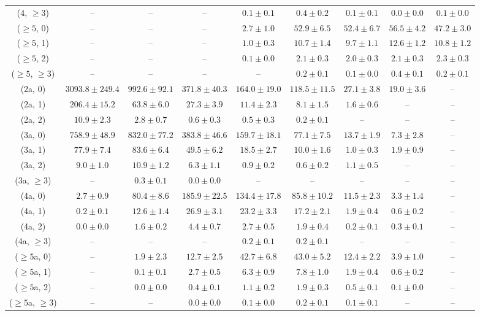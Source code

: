 \begin{table}[h!]
{\begin{tabular}{ccccccccc}
	(4, $\ge3$) & -- & -- & -- & $0.1\pm 0.1$ & $0.4\pm 0.2$ & $0.1\pm 0.1$ & $0.0\pm 0.0$ & $0.1\pm 0.0$ \\[0.5ex] 
	($\ge5$, 0) & -- & -- & -- & $2.7\pm 1.0$ & $52.9\pm 6.5$ & $52.4\pm 6.7$ & $56.5\pm 4.2$ & $47.2\pm 3.0$ \\[0.5ex] 
	($\ge5$, 1) & -- & -- & -- & $1.0\pm 0.3$ & $10.7\pm 1.4$ & $9.7\pm 1.1$ & $12.6\pm 1.2$ & $10.8\pm 1.2$ \\[0.5ex] 
	($\ge5$, 2) & -- & -- & -- & $0.1\pm 0.0$ & $2.1\pm 0.3$ & $2.0\pm 0.3$ & $2.1\pm 0.3$ & $2.3\pm 0.3$ \\[0.5ex] 
	($\ge5$, $\ge3$) & -- & -- & -- & -- & $0.2\pm 0.1$ & $0.1\pm 0.0$ & $0.4\pm 0.1$ & $0.2\pm 0.1$ \\[0.5ex] 
	(2a, 0) & $3093.8\pm 249.4$ & $992.6\pm 92.1$ & $371.8\pm 40.3$ & $164.0\pm 19.0$ & $118.5\pm 11.5$ & $27.1\pm 3.8$ & $19.0\pm 3.6$ & -- \\[0.5ex] 
	(2a, 1) & $206.4\pm 15.2$ & $63.8\pm 6.0$ & $27.3\pm 3.9$ & $11.4\pm 2.3$ & $8.1\pm 1.5$ & $1.6\pm 0.6$ & -- & -- \\[0.5ex] 
	(2a, 2) & $10.9\pm 2.3$ & $2.8\pm 0.7$ & $0.6\pm 0.3$ & $0.5\pm 0.3$ & $0.2\pm 0.1$ & -- & -- & -- \\[0.5ex] 
	(3a, 0) & $758.9\pm 48.9$ & $832.0\pm 77.2$ & $383.8\pm 46.6$ & $159.7\pm 18.1$ & $77.1\pm 7.5$ & $13.7\pm 1.9$ & $7.3\pm 2.8$ & -- \\[0.5ex] 
	(3a, 1) & $77.9\pm 7.4$ & $83.6\pm 6.4$ & $49.5\pm 6.2$ & $18.5\pm 2.7$ & $10.0\pm 1.6$ & $1.0\pm 0.3$ & $1.9\pm 0.9$ & -- \\[0.5ex] 
	(3a, 2) & $9.0\pm 1.0$ & $10.9\pm 1.2$ & $6.3\pm 1.1$ & $0.9\pm 0.2$ & $0.6\pm 0.2$ & $1.1\pm 0.5$ & -- & -- \\[0.5ex] 
	(3a, $\ge3$) & -- & $0.3\pm 0.1$ & $0.0\pm 0.0$ & -- & -- & -- & -- & -- \\[0.5ex] 
	(4a, 0) & $2.7\pm 0.9$ & $80.4\pm 8.6$ & $185.9\pm 22.5$ & $134.4\pm 17.8$ & $85.8\pm 10.2$ & $11.5\pm 2.3$ & $3.3\pm 1.4$ & -- \\[0.5ex] 
	(4a, 1) & $0.2\pm 0.1$ & $12.6\pm 1.4$ & $26.9\pm 3.1$ & $23.2\pm 3.3$ & $17.2\pm 2.1$ & $1.9\pm 0.4$ & $0.6\pm 0.2$ & -- \\[0.5ex] 
	(4a, 2) & $0.0\pm 0.0$ & $1.6\pm 0.2$ & $4.4\pm 0.7$ & $2.7\pm 0.5$ & $1.9\pm 0.4$ & $0.2\pm 0.1$ & $0.3\pm 0.1$ & -- \\[0.5ex] 
	(4a, $\ge3$) & -- & -- & -- & $0.2\pm 0.1$ & $0.2\pm 0.1$ & -- & -- & -- \\[0.5ex] 
	($\ge5$a, 0) & -- & $1.9\pm 2.3$ & $12.7\pm 2.5$ & $42.7\pm 6.8$ & $43.0\pm 5.2$ & $12.4\pm 2.2$ & $3.9\pm 1.0$ & -- \\[0.5ex] 
	($\ge5$a, 1) & -- & $0.1\pm 0.1$ & $2.7\pm 0.5$ & $6.3\pm 0.9$ & $7.8\pm 1.0$ & $1.9\pm 0.4$ & $0.6\pm 0.2$ & -- \\[0.5ex] 
	($\ge5$a, 2) & -- & $0.0\pm 0.0$ & $0.4\pm 0.1$ & $1.1\pm 0.2$ & $1.9\pm 0.3$ & $0.5\pm 0.1$ & $0.1\pm 0.0$ & -- \\[0.5ex] 
	($\ge5$a, $\ge3$) & -- & -- & $0.0\pm 0.0$ & $0.1\pm 0.0$ & $0.2\pm 0.1$ & $0.1\pm 0.1$ & -- & -- \\[0.5ex] 
	\hline
	\hline
\end{tabular}}
\end{table}
